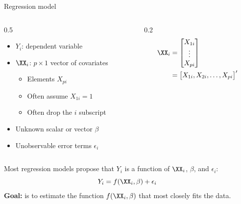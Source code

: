 \documentclass[compress, 8pt]{beamer}
\begin{document}



\begin{frame}{Regression model}
{
    \small
\begin{columns}
\begin{column}{0.5\textwidth}
\begin{itemize}
    \item $Y_i$: dependent variable
    \item $\XX_i$: $p \times 1$ vector of covariates
    \begin{itemize}
        \item Elements $X_{pi}$
        \item Often assume $X_{1i} = 1$
        \item Often drop the $i$ subscript
    \end{itemize}
    \item Unknown scalar or vector $\beta$
    \item Unobservable error terms $\epsilon_i$
\end{itemize}
\end{column}
\begin{column}{0.2\textwidth}
\begin{align*}
\XX_i &= \begin{bmatrix} X_{1i} \\ \vdots \\ X_{pi} \end{bmatrix} \\
&= \begin{bmatrix}
    X_{1i}, X_{2i}, \dots, X_{pi}
\end{bmatrix}^\prime
\end{align*}
\end{column}
\end{columns}
}

Most regression models propose that $Y_i$ is a function of $\XX_i$, $\beta$, and $\epsilon_i$:
\begin{equation*}
    Y_i = f(\XX_i, \beta) + \epsilon_i
\end{equation*}
\textbf{Goal:} is to estimate the function $f(\XX_i, \beta)$ that most closely fits the data. 


\end{frame}
\end{document}
